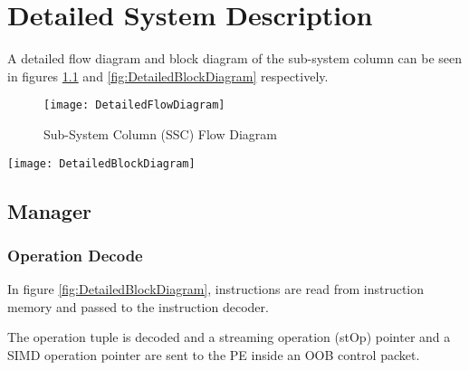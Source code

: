 

\chapter{Detailed System Description}
\label{sec:Detailed System Description}

A detailed flow diagram and block diagram of the sub-system column can be seen in figures \ref{fig:DetailedFlowDiagram} and \ref{fig:DetailedBlockDiagram} respectively.
\begin{figure}
\centering
\captionsetup{justification=centering}
\captionsetup{width=.9\linewidth}
\centerline{
\mbox{\texttt{[image: DetailedFlowDiagram]}}
}
\center\caption{Sub-System Column (SSC) Flow Diagram}
\label{fig:DetailedFlowDiagram}
\end{figure}

\begin{sidewaysfigure}[h]
\centering
\captionsetup{justification=centering}
\captionsetup{width=0.9\textwidth}
\centerline{
\mbox{\texttt{[image: DetailedBlockDiagram]}}
}
\center\caption{Sub-System Column (SSC) Block Diagram}
\label{fig:DetailedBlockDiagram}
\end{sidewaysfigure}

\section{Manager}
\label{sec:manager}

\subsection{Operation Decode}
\label{ssec:operationDecode}

In figure \ref{fig:DetailedBlockDiagram}, instructions are read from instruction memory and passed to the instruction decoder.

The operation tuple is decoded and a streaming operation (stOp) pointer and a SIMD operation pointer are sent to the PE inside an OOB control packet.

